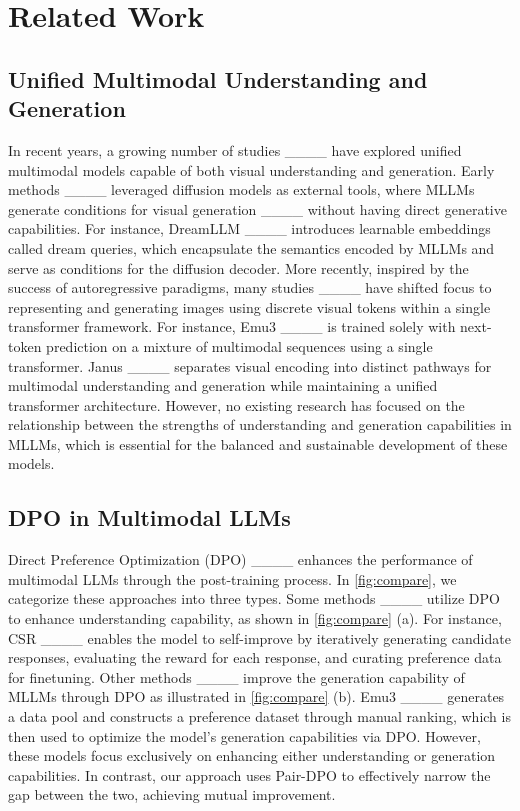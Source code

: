 \section{Related Work}
\subsection{Unified Multimodal Understanding and Generation}
In recent years, a growing number of studies ____ have explored unified multimodal models capable of both visual understanding and generation. Early methods ____ leveraged diffusion models as external tools, where MLLMs generate conditions for visual generation ____ without having direct generative capabilities. For instance, DreamLLM ____ introduces learnable embeddings called dream queries, which encapsulate the semantics encoded by MLLMs and serve as conditions for the diffusion decoder. More recently, inspired by the success of autoregressive paradigms, many studies ____ have shifted focus to representing and generating images using discrete visual tokens within a single transformer framework. For instance, Emu3 ____ is trained solely with next-token prediction on a mixture of multimodal sequences using a single transformer. Janus ____ separates visual encoding into distinct pathways for multimodal understanding and generation while maintaining a unified transformer architecture. However, no existing research has focused on the relationship between the strengths of understanding and generation capabilities in MLLMs, which is essential for the balanced and sustainable development of these models.




\subsection{DPO in Multimodal LLMs}
Direct Preference Optimization (DPO) ____ enhances the performance of multimodal LLMs through the post-training process. In \cref{fig:compare}, we categorize these approaches into three types. Some methods ____ utilize DPO to enhance understanding capability, as shown in \cref{fig:compare} (a). For instance, CSR ____ enables the model to self-improve by iteratively generating candidate responses, evaluating the reward for each response, and curating preference data for finetuning. Other methods ____ improve the generation capability of MLLMs through DPO as illustrated in \cref{fig:compare} (b). Emu3 ____ generates a data pool and constructs a preference dataset through manual ranking, which is then used to optimize the model's generation capabilities via DPO. However, these models focus exclusively on enhancing either understanding or generation capabilities. In contrast, our approach uses Pair-DPO to effectively narrow the gap between the two, achieving mutual improvement.